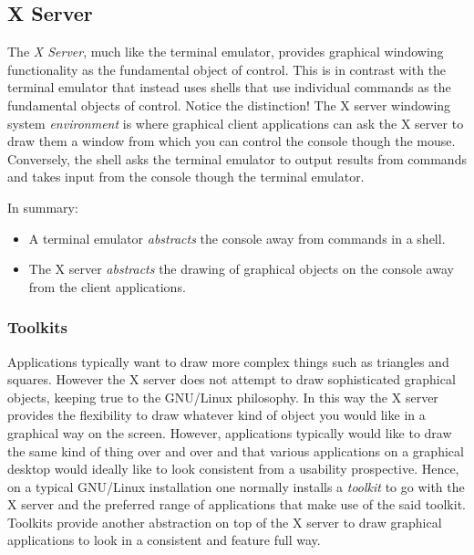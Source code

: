 
\subsection{X Server} %
\label{sec:xserver}

The \emph{X Server}, much like the terminal emulator, provides graphical
windowing functionality as the fundamental object of control. This is in
contrast with the terminal emulator that instead uses shells that use
individual commands as the fundamental objects of control. Notice the
distinction! The X server windowing system \emph{environment} is where
graphical client applications can ask the X server to draw them a window
from which you can control the console though the mouse. Conversely, the
shell asks the terminal emulator to output results from commands and takes
input from the console though the terminal emulator.

In summary:
\begin{itemize}
	\item A terminal emulator \emph{abstracts} the console away from commands
		in a shell.
	\item The X server \emph{abstracts} the drawing of graphical objects on the
		console away from the client applications.
\end{itemize}

\subsubsection{Toolkits}

Applications typically want to draw more complex things such as triangles and
squares. However the X server does not attempt to draw sophisticated graphical
objects, keeping true to the GNU/Linux philosophy. In this way the X server provides
the flexibility to draw whatever kind of object you would like in a graphical way
on the screen. However, applications typically would like to draw the same kind of
thing over and over and that various applications on a graphical desktop would
ideally like to look consistent from a usability prospective. Hence, on a typical
GNU/Linux installation one normally installs a \emph{toolkit} to go with the X server
and the preferred range of applications that make use of the said toolkit. Toolkits
provide another abstraction on top of the X server to draw graphical applications to
look in a consistent and feature full way.


